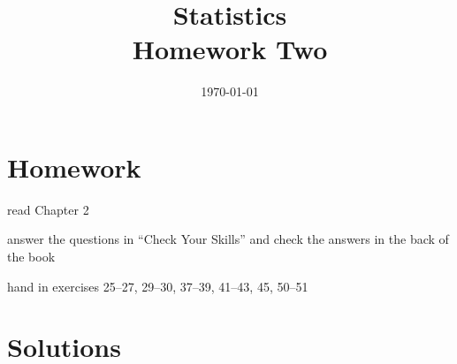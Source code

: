 \documentclass[letterpaper, landscape]{exam}
\title{Statistics \\ Homework Two}
\author{}
\date{\today}
\begin{document}
  \maketitle

  \section{Homework}

  \begin{itemize*}
    \item read Chapter 2 
    \item answer the questions in ``Check Your Skills'' and check the answers
      in the back of the book
    \item hand in exercises 25--27, 29--30, 37--39, 41--43, 45, 50--51
  \end{itemize*}

  \ifprintanswers{}
    \section{Solutions}
\end{document}
